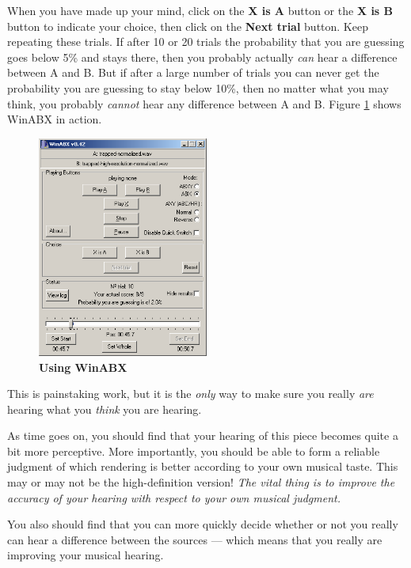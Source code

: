 \documentclass[english,11pt,letterpaper,onecolumn]{scrartcl}
\begin{document}
When you have made up your mind, click on the \textbf{X is A} button or the 
\textbf{X is B} button to indicate your choice, then click on the \textbf{Next 
trial} button. Keep repeating these trials. If after 10 or 20 trials the 
probability that you are guessing goes below 5\% and stays there, then you 
probably actually \emph{can} hear a difference between A and B. But if 
after a large number of trials you can never get the probability you are 
guessing to stay below 10\%, then no matter what you may think, you probably  
\emph{cannot} hear any difference between A and B. Figure \ref{fig:winabx} 
shows WinABX in action.

\begin{figure}[!htp]
	\centering
		\includegraphics[width=0.5\textwidth]{winabx.png}
	\caption{\textbf{Using WinABX}}
	\label{fig:winabx}
\end{figure}

This is painstaking work, but it is the \emph{only} way to make sure you 
really \emph{are} hearing what you \emph{think} you are hearing.

As time goes on, you should find that your hearing of this piece becomes quite 
a bit more perceptive. More importantly, you should be able to form a reliable 
judgment of which rendering is better according to your own musical taste. 
This may or may not be the high-definition version! \emph{The vital thing is 
to improve the accuracy of your hearing with respect to your own musical 
judgment.} 

You also should find that you can more quickly decide whether or not you 
really can hear a difference between the sources --- which means that you 
really are improving your musical hearing.
\end{document}
